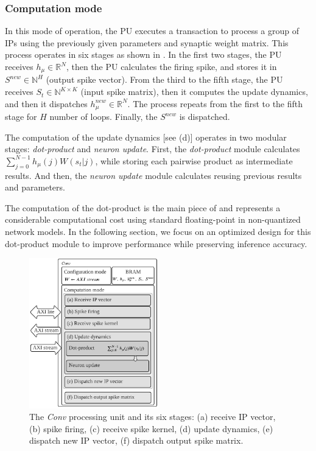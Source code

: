 \subsubsection{Computation mode}
In this mode of operation, the PU executes a transaction to process a group of IPs using the previously given parameters and synaptic weight matrix. This process operates in six stages as shown in . In the first two stages, the PU receives $h_\mu\in\mathbb{R}^{N}$, then the PU calculates the firing spike, and stores it in $S^{new}\in\mathbb{N}^{H}$ (output spike vector). From the third to the fifth stage, the PU receives $S_t\in\mathbb{N}^{K\times K}$ (input spike matrix), then it computes the update dynamics, and then it dispatches $h_\mu^{new}\in\mathbb{R}^{N}$. The process repeats from the first to the fifth stage for $H$ number of loops. Finally, the $S^{new}$ is dispatched.

The computation of the update dynamics [see (d)] operates in two modular stages: \emph{dot-product} and \emph{neuron update}. First, the \emph{dot-product} module calculates $\sum_{j=0}^{N-1}h_{\mu}(j)W(s_t|j)$, while storing each pairwise product as intermediate results. And then, the \emph{neuron update} module calculates  reusing previous results and parameters.


The computation of the dot-product is the main piece of  and represents a considerable computational cost using standard floating-point in non-quantized network models. In the following section, we focus on an optimized design for this dot-product module to improve performance while preserving inference accuracy.

\begin{figure}
	\centering
	\includegraphics[width=0.5\textwidth]{../figures/sbs_conv.pdf}
	\caption{The \emph{Conv} processing unit and its six stages: (a) receive IP vector, (b) spike firing, (c) receive spike kernel, (d) update dynamics, (e) dispatch new IP vector, (f) dispatch output spike matrix.}
	\label{fig:hw_conv}
\end{figure}

